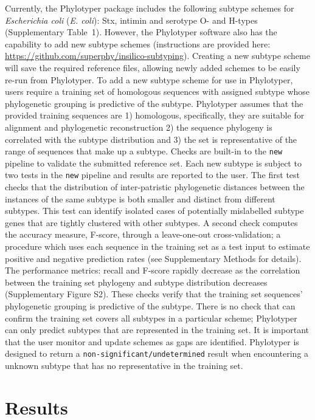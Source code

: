 \documentclass{bioinfo}
\begin{document}
Currently, the Phylotyper package includes the following subtype schemes for \emph{Escherichia coli} (\textit{E. coli}): Stx, intimin and serotype O- and H-types  (Supplementary Table~1).
However, the Phylotyper software also has the capability to add new subtype schemes (instructions are provided here: \url{https://github.com/superphy/insilico-subtyping}). 
Creating a new subtype scheme will save the required reference files, allowing newly added schemes to be easily re-run from Phylotyper.
To add a new subtype scheme for use in Phylotyper, users require a training set of homologous sequences with assigned subtype whose phylogenetic grouping is predictive of the subtype.
Phylotyper assumes that the provided training sequences are 1) homologous, specifically, they are suitable for alignment and phylogenetic reconstruction 2) the sequence phylogeny is correlated with the subtype distribution and 3) the set is representative of the range of sequences that make up a subtype.
Checks are built-in to the \texttt{new} pipeline to validate the submitted reference set.
Each new subtype is subject to two tests in the \texttt{new} pipeline and results are reported to the user.
The first test checks that the distribution of inter-patristic phylogenetic distances between the instances of the same subtype is both smaller and distinct from different subtypes.
This test can identify isolated cases of potentially mislabelled subtype genes that are tightly clustered with other subtypes.
A second check computes the accuracy measure, F-score, through a leave-one-out cross-validation; a procedure which uses each sequence in the training set as a test input to estimate positive and negative prediction rates (see Supplementary Methods for details).
The performance metrics: recall and F-score rapidly decrease as the correlation between the training set phylogeny and subtype distribution decreases (Supplementary Figure S2).
These checks verify that the training set sequences' phylogenetic grouping is predictive of the subtype.
There is no check that can confirm the training set covers all subtypes in a particular scheme; Phylotyper can only predict subtypes that are represented in the training set.
It is important that the user monitor and update schemes as gaps are identified.
Phylotyper is designed to return a \texttt{non-significant/undetermined} result when encountering a unknown subtype that has no representative in the training set.

\section{Results}
\end{document}
